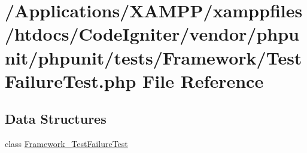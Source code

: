\hypertarget{_test_failure_test_8php}{}\section{/\+Applications/\+X\+A\+M\+P\+P/xamppfiles/htdocs/\+Code\+Igniter/vendor/phpunit/phpunit/tests/\+Framework/\+Test\+Failure\+Test.php File Reference}
\label{_test_failure_test_8php}
\subsection*{Data Structures}
\begin{DoxyCompactItemize}
\item 
class \mbox{\hyperlink{class_framework___test_failure_test}{Framework\+\_\+\+Test\+Failure\+Test}}
\end{DoxyCompactItemize}
